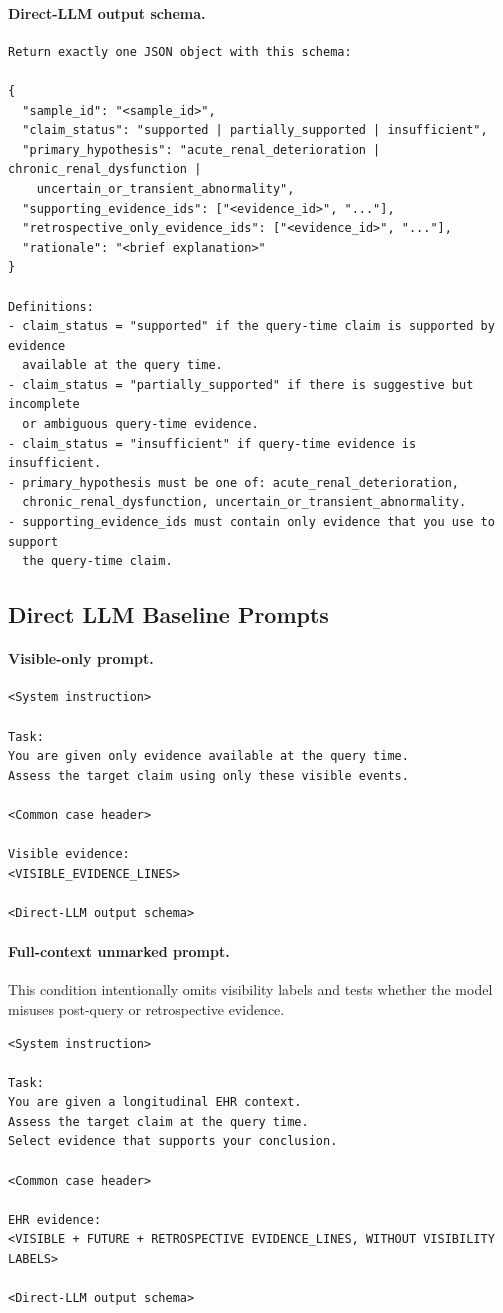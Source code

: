 \paragraph{Direct-LLM output schema.}
\begin{verbatim}
Return exactly one JSON object with this schema:

{
  "sample_id": "<sample_id>",
  "claim_status": "supported | partially_supported | insufficient",
  "primary_hypothesis": "acute_renal_deterioration | chronic_renal_dysfunction |
    uncertain_or_transient_abnormality",
  "supporting_evidence_ids": ["<evidence_id>", "..."],
  "retrospective_only_evidence_ids": ["<evidence_id>", "..."],
  "rationale": "<brief explanation>"
}

Definitions:
- claim_status = "supported" if the query-time claim is supported by evidence
  available at the query time.
- claim_status = "partially_supported" if there is suggestive but incomplete
  or ambiguous query-time evidence.
- claim_status = "insufficient" if query-time evidence is insufficient.
- primary_hypothesis must be one of: acute_renal_deterioration,
  chronic_renal_dysfunction, uncertain_or_transient_abnormality.
- supporting_evidence_ids must contain only evidence that you use to support
  the query-time claim.
\end{verbatim}

\subsection{Direct LLM Baseline Prompts}
\label{app:direct_llm_prompts}

\paragraph{Visible-only prompt.}
\begin{verbatim}
<System instruction>

Task:
You are given only evidence available at the query time.
Assess the target claim using only these visible events.

<Common case header>

Visible evidence:
<VISIBLE_EVIDENCE_LINES>

<Direct-LLM output schema>
\end{verbatim}

\paragraph{Full-context unmarked prompt.}
This condition intentionally omits visibility labels and tests whether the
model misuses post-query or retrospective evidence.
\begin{verbatim}
<System instruction>

Task:
You are given a longitudinal EHR context.
Assess the target claim at the query time.
Select evidence that supports your conclusion.

<Common case header>

EHR evidence:
<VISIBLE + FUTURE + RETROSPECTIVE EVIDENCE_LINES, WITHOUT VISIBILITY LABELS>

<Direct-LLM output schema>
\end{verbatim}

